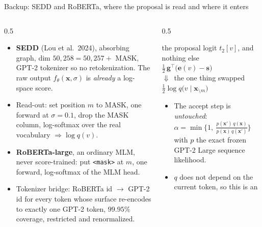 \documentclass{beamer}
\begin{document}
\begin{frame}[noframenumbering]{Backup: SEDD and RoBERTa, where the proposal is read and where it enters}
  \scriptsize
  \begin{columns}[T]
    \begin{column}{0.5\textwidth}
      \begin{itemize}\scriptsize
        \item \textbf{SEDD} (Lou et al.\ 2024), absorbing graph, dim $50{,}258 = 50{,}257 + $ MASK,
          GPT-2 tokenizer so no retokenization. The raw output $f_\theta(\bm{x},\sigma)$ is
          \emph{already} a log-space score.
        \item Read-out: set position $m$ to MASK, one forward at $\sigma = 0.1$, drop the MASK
          column, log-softmax over the real vocabulary $\Rightarrow \log q(v)$.
        \item \textbf{RoBERTa-large}, an ordinary MLM, never score-trained: put
          \texttt{<mask>} at $m$, one forward, log-softmax of the MLM head.
        \item Tokenizer bridge: RoBERTa id $\to$ GPT-2 id for every token whose surface
          re-encodes to exactly one GPT-2 token, $99.95\%$ coverage, restricted and renormalized.
      \end{itemize}
    \end{column}
    \begin{column}{0.5\textwidth}
      \vspace{0.2em}
      \begin{center}
        {\scriptsize the proposal logit $t_2[v]$, and nothing else}\\[0.2em]
        $\tfrac12\,\bm{g}^\top\!\big(\bm{e}(v)-\bm{s}\big)$\\[0.15em]
        {\scriptsize\textcolor{imsred}{$\Downarrow$\ the one thing swapped}}\\[0.15em]
        $\tfrac12 \log q\big(v \mid \bm{x}_{\setminus m}\big)$
      \end{center}
      \vspace{0.2em}
      \begin{itemize}\scriptsize
        \item The accept step is \emph{untouched}:
          $\alpha = \min\{1,\ \tfrac{p(\bm{x}')\,q(\bm{x})}{p(\bm{x})\,q(\bm{x}')}\}$ with $p$ the
          exact frozen GPT-2 Large sequence likelihood.
        \item $q$ does not depend on the current token, so this is an 
\end{itemize}
\end{column}
\end{columns}
\end{frame}
\end{document}
